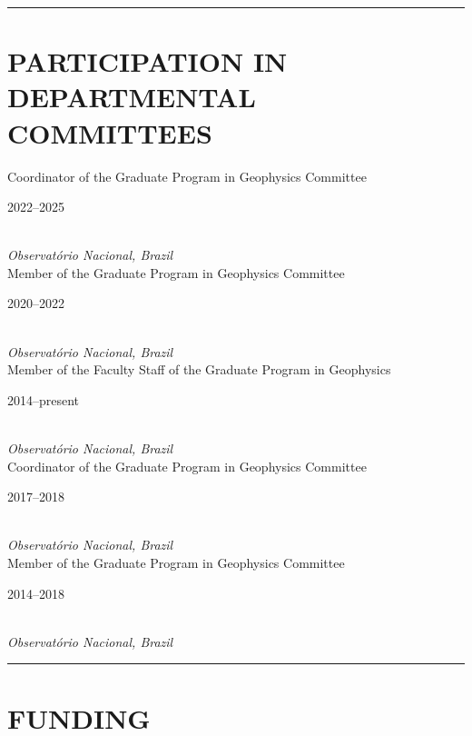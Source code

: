 \documentclass[11pt,a4paper,onecolumn]{article}
\begin{document}
\bigskip \hrule

\section*{PARTICIPATION IN DEPARTMENTAL COMMITTEES}{}

\medskip
	
\noindent Coordinator of the Graduate Program in Geophysics Committee \hfill \parbox{0.1\textwidth}{\raggedright 2022--2025} \\
\noindent \textsl{Observat\'{o}rio Nacional, Brazil} \vspace{0.5\baselineskip} \\
\noindent Member of the Graduate Program in Geophysics Committee \hfill \parbox{0.1\textwidth}{\raggedright 2020--2022} \\
\noindent \textsl{Observat\'{o}rio Nacional, Brazil} \vspace{0.5\baselineskip} \\
\noindent Member of the Faculty Staff of the Graduate Program in Geophysics \hfill \parbox{0.1\textwidth}{\raggedright 2014--present} \\
\noindent \textsl{Observat\'{o}rio Nacional, Brazil} \vspace{0.5\baselineskip} \\
\noindent Coordinator of the Graduate Program in Geophysics Committee \hfill \parbox{0.1\textwidth}{\raggedright 2017--2018} \\
\noindent \textsl{Observat\'{o}rio Nacional, Brazil} \vspace{0.5\baselineskip} \\
\noindent Member of the Graduate Program in Geophysics Committee \hfill \parbox{0.1\textwidth}{\raggedright 2014--2018} \\
\noindent \textsl{Observat\'{o}rio Nacional, Brazil} \vspace{0.5\baselineskip} \\


\bigskip \hrule

\section*{FUNDING}
\end{document}
